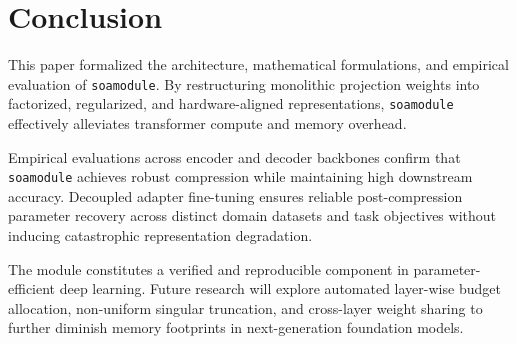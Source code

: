 \section{Conclusion}
This paper formalized the architecture, mathematical formulations, and empirical evaluation of \texttt{soamodule}. By restructuring monolithic projection weights into factorized, regularized, and hardware-aligned representations, \texttt{soamodule} effectively alleviates transformer compute and memory overhead.

Empirical evaluations across encoder and decoder backbones confirm that \texttt{soamodule} achieves robust compression while maintaining high downstream accuracy. Decoupled adapter fine-tuning ensures reliable post-compression parameter recovery across distinct domain datasets and task objectives without inducing catastrophic representation degradation.

The module constitutes a verified and reproducible component in parameter-efficient deep learning. Future research will explore automated layer-wise budget allocation, non-uniform singular truncation, and cross-layer weight sharing to further diminish memory footprints in next-generation foundation models.
